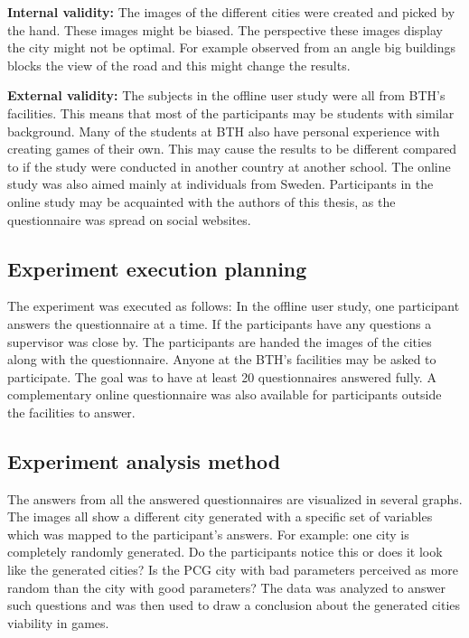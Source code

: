 	\par
	\textbf{Internal validity:} The images of the different cities were created and picked by the hand. These images might be biased. The perspective these images display the city might not be optimal. For example observed from an angle big buildings blocks the view of the road and this might change the results.
	
	\par
	\textbf{External validity:} The subjects in the offline user study were all from BTH's facilities. This means that most of the participants may be students with similar background. Many of the students at BTH also have personal experience with creating games of their own. This may cause the results to be different compared to if the study were conducted in another country at another school. The online study was also aimed mainly at individuals from Sweden. Participants in the online study may be acquainted with the authors of this thesis, as the questionnaire was spread on social websites.
	
	\subsection{Experiment execution planning}
	The experiment was executed as follows: In the offline user study, one participant answers the questionnaire at a time. If the participants have any questions a supervisor was close by. The participants are handed the images of the cities along with the questionnaire. Anyone at the BTH's facilities may be asked to participate. The goal was to have at least 20 questionnaires answered fully. A complementary online questionnaire was also available for participants outside the facilities to answer.
		
	\subsection{Experiment analysis method}
	The answers from all the answered questionnaires are visualized in several graphs. The images all show a different city generated with a specific set of variables which was mapped to the participant's answers. For example: one city is completely randomly generated. Do the participants notice this or does it look like the generated cities? Is the PCG city with bad parameters perceived as more random than the city with good parameters? The data was analyzed to answer such questions and was then used to draw a conclusion about the generated cities viability in games.
	
